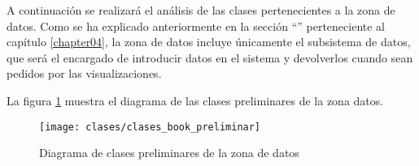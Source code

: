 A continuación se realizará el análisis de las clases pertenecientes a la zona de datos. Como se ha explicado anteriormente en la sección ``'' perteneciente al capítulo \ref{chapter04}, la zona de datos incluye únicamente el subsistema de datos, que será el encargado de introducir datos en el sistema y devolverlos cuando sean pedidos por las visualizaciones.

La figura \ref{fig:clases_preliminares_modelo_book} muestra el diagrama de las clases preliminares de la zona datos.

\begin{landscape}
	\begin{figure}[ht]
		\centering
		\texttt{[image: clases/clases\_book\_preliminar]}
		\caption{Diagrama de clases preliminares de la zona de datos}
		\label{fig:clases_preliminares_modelo_book}
	\end{figure}
\end{landscape}


